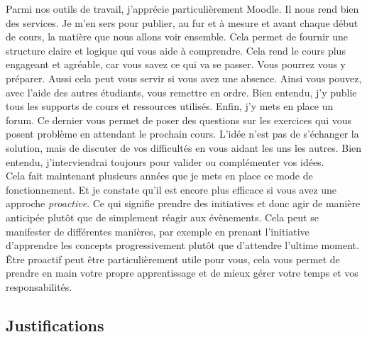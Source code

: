 Parmi nos outils de travail, j'apprécie particulièrement Moodle. Il nous rend bien des services. Je m'en sers pour publier, au fur et à mesure et avant chaque début de cours, la matière que nous allons voir ensemble. Cela permet de fournir une structure claire et logique qui vous aide à comprendre. Cela rend le cours plus engageant et agréable, car vous savez ce qui va se passer. Vous pourrez vous y préparer. Aussi cela peut vous servir si vous avez une absence. Ainsi vous pouvez, avec l'aide des autres étudiants, vous remettre en ordre. Bien entendu, j'y publie tous les supports de cours et ressources utilisés. Enfin, j’y mets en place un forum. Ce dernier vous permet de poser des questions sur les exercices qui vous posent problème en attendant le prochain cours. L'idée n'est pas de s'échanger la solution, mais de discuter de vos difficultés en vous aidant les uns les autres. Bien entendu, j'interviendrai toujours pour valider ou complémenter vos idées.\\

Cela fait maintenant plusieurs années que je mets en place ce mode de fonctionnement. Et je constate qu'il est encore plus efficace si vous avez une approche \emph{proactive}. Ce qui signifie prendre des initiatives et donc agir de manière anticipée plutôt que de simplement réagir aux évènements. Cela peut se manifester de différentes manières, par exemple en prenant l'initiative d'apprendre les concepts progressivement plutôt que d'attendre l'ultime moment. Être proactif peut être particulièrement utile pour vous, cela vous permet de prendre en main votre propre apprentissage et de mieux gérer votre temps et vos responsabilités.

\clearpage
\subsection{Justifications}

